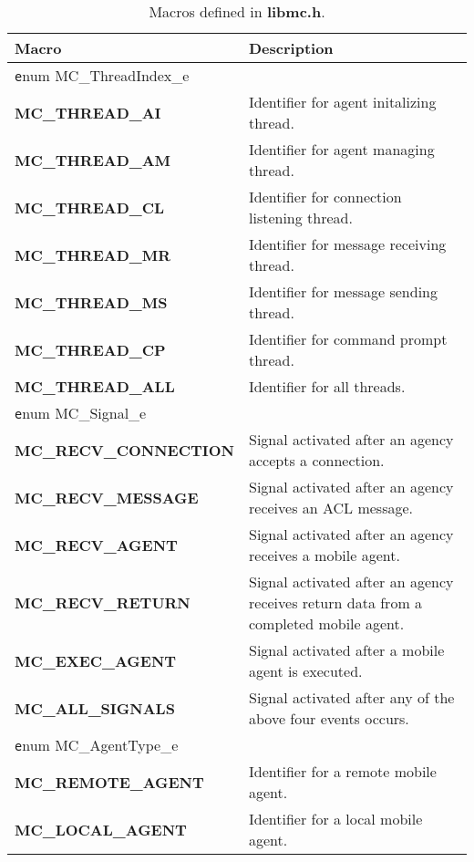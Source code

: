 \begin{table}[!h]
\capstart
\begin{center}
\caption{Macros defined in {\bf libmc.h}.}
\begin{tabular}{p{50 mm}p{110 mm}}
\hline
Macro & Description \\
\hline
{\texttt enum MC\_ThreadIndex\_e} & \\
\hline
{\bf MC\_THREAD\_AI} \index{MC\_THREAD\_AI} & Identifier for agent initalizing thread. \\
{\bf MC\_THREAD\_AM} \index{MC\_THREAD\_AM} & Identifier for agent managing thread. \\
{\bf MC\_THREAD\_CL} \index{MC\_THREAD\_CL} & Identifier for connection listening thread. \\
{\bf MC\_THREAD\_MR} \index{MC\_THREAD\_MR} & Identifier for message receiving thread. \\
{\bf MC\_THREAD\_MS} \index{MC\_THREAD\_MS} & Identifier for message sending thread. \\
{\bf MC\_THREAD\_CP} \index{MC\_THREAD\_CP} & Identifier for command prompt thread. \\
{\bf MC\_THREAD\_ALL} \index{MC\_THREAD\_ALL} & Identifier for all threads. \\
\hline
{\texttt enum MC\_Signal\_e} & \\
\hline
{\bf MC\_RECV\_CONNECTION} \index{MC\_RECV\_CONNECTION} & Signal activated after an agency accepts a connection. \\
{\bf MC\_RECV\_MESSAGE} \index{MC\_RECV\_MESSAGE} & Signal activated after an agency receives an ACL message. \\
{\bf MC\_RECV\_AGENT} \index{MC\_RECV\_AGENT} & Signal activated after an agency receives a mobile agent. \\
{\bf MC\_RECV\_RETURN} \index{MC\_RECV\_RETURN} & Signal activated after an agency receives return data from a completed mobile agent. \\
{\bf MC\_EXEC\_AGENT} \index{MC\_EXEC\_AGENT} & Signal activated after a mobile agent is executed. \\
{\bf MC\_ALL\_SIGNALS} \index{MC\_ALL\_SIGNALS} & Signal activated after any of the above four events occurs. \\
\hline
{\texttt enum MC\_AgentType\_e} \index{MC\_AgentType\_e}& \\
\hline
{\bf MC\_REMOTE\_AGENT} \index{MC\_REMOTE\_AGENT} & Identifier for a remote mobile agent. \\
{\bf MC\_LOCAL\_AGENT} \index{MC\_LOCAL\_AGENT} & Identifier for a local mobile agent.\\

\end{tabular}
\end{center}
\end{table}
